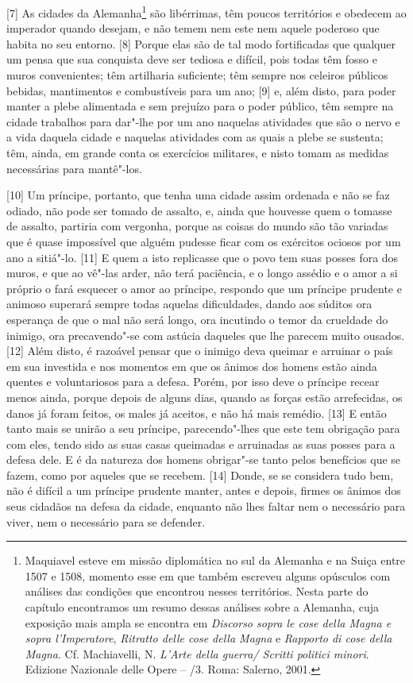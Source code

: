 {[}7{]} As cidades da Alemanha\footnote{Maquiavel esteve em missão
  diplomática no sul da Alemanha e na Suiça entre 1507 e 1508, momento
  esse em que também escreveu alguns opúsculos com análises das
  condições que encontrou nesses territórios. Nesta parte do capítulo
  encontramos um resumo dessas análises sobre a Alemanha, cuja exposição
  mais ampla se encontra em \emph{Discorso sopra le cose della Magna e
  sopra l'Imperatore}, \emph{Ritratto delle cose della Magna} e
  \emph{Rapporto di cose della Magna}. Cf. Machiavelli, N. \emph{L'Arte
  della guerra/ Scritti politici minori}. Edizione Nazionale delle Opere
  -- /3. Roma: Salerno, 2001.} são libérrimas, têm poucos territórios e
obedecem ao imperador quando desejam, e não temem nem este nem aquele
poderoso que habita no seu entorno. {[}8{]} Porque elas são de tal modo
fortificadas que qualquer um pensa que sua conquista deve ser tediosa e
difícil, pois todas têm fosso e muros convenientes; têm artilharia
suficiente; têm sempre nos celeiros públicos bebidas, mantimentos e
combustíveis para um ano; {[}9{]} e, além disto, para poder manter a
plebe alimentada e sem prejuízo para o poder público, têm sempre na
cidade trabalhos para dar"-lhe por um ano naquelas atividades que são o
nervo e a vida daquela cidade e naquelas atividades com as quais a plebe
se sustenta; têm, ainda, em grande conta os exercícios militares, e
nisto tomam as medidas necessárias para mantê"-los.

{[}10{]} Um príncipe, portanto, que tenha uma cidade assim ordenada e
não se faz odiado, não pode ser tomado de assalto, e, ainda que houvesse
quem o tomasse de assalto, partiria com vergonha, porque as coisas do
mundo são tão variadas que é quase impossível que alguém pudesse ficar
com os exércitos ociosos por um ano a sitiá"-lo. {[}11{]} E quem a isto
replicasse que o povo tem suas posses fora dos muros, e que ao vê"-las
arder, não terá paciência, e o longo assédio e o amor a si próprio o
fará esquecer o amor ao príncipe, respondo que um príncipe prudente e
animoso superará sempre todas aquelas dificuldades, dando aos súditos
ora esperança de que o mal não será longo, ora incutindo o temor da
crueldade do inimigo, ora precavendo"-se com astúcia daqueles que lhe
parecem muito ousados. {[}12{]} Além disto, é razoável pensar que o
inimigo deva queimar e arruinar o país em sua investida e nos momentos
em que os ânimos dos homens estão ainda quentes e voluntariosos para a
defesa. Porém, por isso deve o príncipe recear menos ainda, porque
depois de alguns dias, quando as forças estão arrefecidas, os danos já
foram feitos, os males já aceitos, e não há mais remédio. {[}13{]} E
então tanto mais se unirão a seu príncipe, parecendo"-lhes que este tem
obrigação para com eles, tendo sido as suas casas queimadas e arruinadas
as suas posses para a defesa dele. E é da natureza dos homens obrigar"-se
tanto pelos benefícios que se fazem, como por aqueles que se recebem.
{[}14{]} Donde, se se considera tudo bem, não é difícil a um príncipe
prudente manter, antes e depois, firmes os ânimos dos seus cidadãos na
defesa da cidade, enquanto não lhes faltar nem o necessário para viver,
nem o necessário para se defender.

